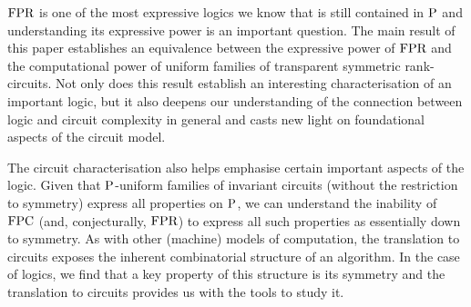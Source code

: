 \documentclass[../paper.tex]{subfiles}
\begin{document}
$\text{\upshape FPR}$ is one of the most expressive logics we know that is still
contained in $\mathrm{P}$ and understanding its expressive power is an
important question.  The main result of this paper establishes an equivalence between the
expressive power of $\text{\upshape FPR}$ and the computational power of uniform families
of transparent symmetric rank-circuits.  Not only does this result establish an
interesting characterisation of an important
logic, but it also deepens our understanding of the connection between
logic and circuit complexity in general and casts new light on
foundational aspects of the circuit model.

The circuit characterisation also helps emphasise certain important
aspects of the logic.  Given that $\mathrm{P}$-uniform families of invariant
circuits (without the restriction to symmetry) express all properties
on $\mathrm{P}$, we can understand  the inability of $\text{\upshape FPC}$ (and,
conjecturally, $\text{\upshape FPR}$) to express all such properties as essentially
down to symmetry.  As with other (machine) models of computation, the
translation to circuits exposes the inherent combinatorial structure
of an algorithm.  In the case of logics, we find that a key property
of this structure is its symmetry and the translation to circuits
provides us with the tools to study it.

\end{document}
